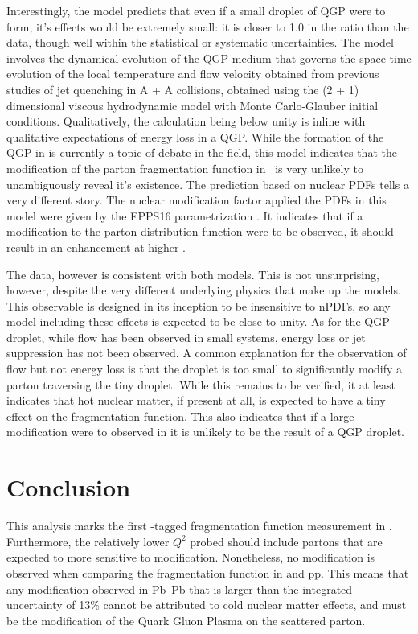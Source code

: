 Interestingly, the model predicts that even if a small droplet of QGP were to form, it's effects would be extremely small: it is closer to 1.0 in the ratio than the data, though well within the statistical or systematic uncertainties. The model involves the dynamical evolution of the QGP medium that governs the space-time evolution of the local temperature and flow velocity obtained from previous studies of jet quenching in A + A collisions, obtained using the (2 + 1) dimensional viscous hydrodynamic model with Monte Carlo-Glauber initial conditions. Qualitatively, the calculation being below unity is inline with qualitative expectations of energy loss in a QGP. While the formation of the QGP in \pPb is currently a topic of debate in the field, this model indicates that the modification of the parton fragmentation function in \pPb~is very unlikely to unambiguously reveal it's existence. The prediction based on nuclear PDFs tells a very different story. The nuclear modification factor applied the PDFs in this model were given by the EPPS16 parametrization \cite{Eskola2017a}. It indicates that if a modification to the parton distribution function were to be observed, it should result in an enhancement at higher \zt. 

The data, however is consistent with both models. This is not unsurprising, however, despite the very different underlying physics that make up the models. This observable is designed in its inception to be insensitive to nPDFs, so any model including these effects is expected to be close to unity. As for the QGP droplet, while flow has been observed in small systems, energy loss or jet suppression has not been observed. A common explanation for the observation of flow but not energy loss is that the droplet is too small to significantly modify a parton traversing the tiny droplet. While this remains to be verified, it at least indicates that hot nuclear matter, if present at all, is expected to have a tiny effect on the fragmentation function. This also indicates that if a large modification were to observed in \pPb it is unlikely to be the result of a QGP droplet.

\section{Conclusion}
This analysis marks the first \gammaiso-tagged fragmentation function measurement in \pPb. Furthermore, the relatively lower $Q^2$ probed should include partons that are expected to more sensitive to modification. Nonetheless, no modification is observed when comparing the fragmentation function in \pPb and pp. This means that any modification observed in Pb--Pb that is larger than the integrated uncertainty of 13\% cannot be attributed to cold nuclear matter effects, and must be the modification of the Quark Gluon Plasma on the scattered parton.

